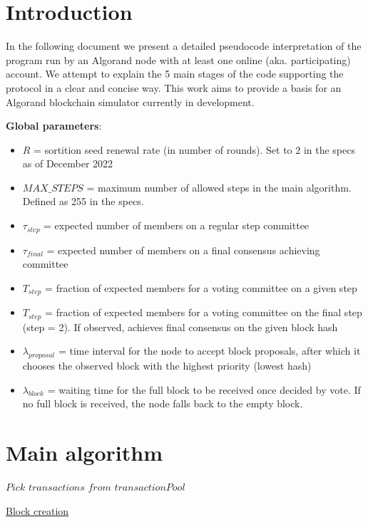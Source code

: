 \documentclass[10pt,a4paper]{article}
\begin{document}
\section{Introduction}
In the following document we present a detailed pseudocode interpretation 
of the program run by an Algorand node with at least one online (aka. 
participating)
account. We attempt to explain the 5 main stages of the code supporting 
the protocol in a clear and concise way.
This work aims to provide a basis for an Algorand blockchain simulator 
currently in development. \newline

\noindent \textbf{Global parameters}:
\begin{itemize}
    \item $R$ = sortition seed renewal rate (in number of rounds). Set to 2 in the specs
    as of December 2022
    \item $MAX\_STEPS$ = maximum number of allowed steps in the main algorithm. Defined 
    as 255 in the specs.
    \item $\tau_{step}$ = expected number of members on a regular step committee
    \item $\tau_{final}$ = expected number of members on a final consensus achieving committee
    \item $T_{step}$ = fraction of expected members for a voting committee on a given step
    \item $T_{step}$ = fraction of expected members for a voting committee on the final step (step = 2). If observed,
    achieves final consensus on the given block hash
    \item $\lambda_{proposal}$ = time interval for the node to accept block proposals, after
    which it chooses the observed block with the highest priority (lowest hash) 
    \item $\lambda_{block}$ = waiting time for the full block to be received once decided by vote.
    If no full block is received, the node falls back to the empty block.
  \end{itemize}


\section{Main algorithm}

\begin{algorithm}
    \begin{algorithmic}[1]
    
    \State $Pick$ $transactions$ $from$ $transactionPool$
    
    \EndFunction
    \end{algorithmic}
    \caption{\underline{Block creation}}
    \label{alg:fuerza_bruta}
\end{algorithm}
\end{document}
